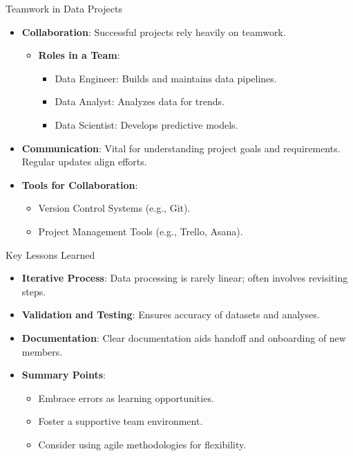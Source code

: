 \documentclass[aspectratio=169]{beamer}
\begin{document}
\begin{frame}{Teamwork in Data Projects}
    \begin{itemize}
        \item \textbf{Collaboration}: Successful projects rely heavily on teamwork.
        \begin{itemize}
            \item \textbf{Roles in a Team}:
                \begin{itemize}
                    \item Data Engineer: Builds and maintains data pipelines.
                    \item Data Analyst: Analyzes data for trends.
                    \item Data Scientist: Develops predictive models.
                \end{itemize}
        \end{itemize}
        \item \textbf{Communication}: Vital for understanding project goals and requirements. Regular updates align efforts.
        \item \textbf{Tools for Collaboration}:
            \begin{itemize}
                \item Version Control Systems (e.g., Git).
                \item Project Management Tools (e.g., Trello, Asana).
            \end{itemize}
    \end{itemize}
\end{frame}

\begin{frame}{Key Lessons Learned}
    \begin{itemize}
        \item \textbf{Iterative Process}: Data processing is rarely linear; often involves revisiting steps.
        \item \textbf{Validation and Testing}: Ensures accuracy of datasets and analyses.
        \item \textbf{Documentation}: Clear documentation aids handoff and onboarding of new members.
        \item \textbf{Summary Points}:
            \begin{itemize}
                \item Embrace errors as learning opportunities.
                \item Foster a supportive team environment.
                \item Consider using agile methodologies for flexibility.
            \end{itemize}
    \end{itemize}
\end{frame}
\end{document}
